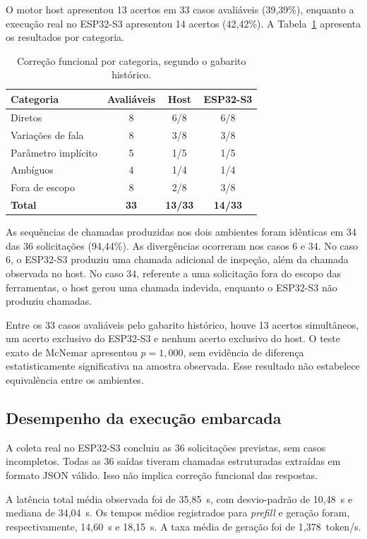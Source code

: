 \documentclass[12pt]{article}
\begin{document}
O motor host apresentou 13 acertos em 33 casos
avaliáveis (39,39\%), enquanto a execução real no
ESP32-S3 apresentou 14 acertos (42,42\%). A
Tabela~\ref{tab:metricas} apresenta os resultados
por categoria.

\begin{table}[ht]
\centering
\caption{Correção funcional por categoria, segundo o
gabarito histórico.}
\label{tab:metricas}
\begin{tabular}{lccc}
\toprule
Categoria & Avaliáveis & Host & ESP32-S3 \\
\midrule
Diretos & 8 & 6/8 & 6/8 \\
Variações de fala & 8 & 3/8 & 3/8 \\
Parâmetro implícito & 5 & 1/5 & 1/5 \\
Ambíguos & 4 & 1/4 & 1/4 \\
Fora de escopo & 8 & 2/8 & 3/8 \\
\midrule
\textbf{Total} & \textbf{33} &
\textbf{13/33} & \textbf{14/33} \\
\bottomrule
\end{tabular}
\end{table}

As sequências de chamadas produzidas nos dois
ambientes foram idênticas em 34 das 36 solicitações
(94,44\%). As divergências ocorreram nos casos
6 e 34. No caso 6, o ESP32-S3 produziu uma
chamada adicional de inspeção, além da chamada
observada no host. No caso 34, referente a uma
solicitação fora do escopo das ferramentas, o
host gerou uma chamada indevida, enquanto o
ESP32-S3 não produziu chamadas.

Entre os 33 casos avaliáveis pelo gabarito
histórico, houve 13 acertos simultâneos,
um acerto exclusivo do ESP32-S3 e nenhum
acerto exclusivo do host. O teste exato de
McNemar apresentou $p=1{,}000$, sem evidência
de diferença estatisticamente significativa
na amostra observada. Esse resultado não
estabelece equivalência entre os ambientes.

\subsection{Desempenho da execução embarcada}

A coleta real no ESP32-S3 concluiu as 36
solicitações previstas, sem casos incompletos.
Todas as 36 saídas tiveram chamadas estruturadas
extraídas em formato JSON válido. Isso não
implica correção funcional das respostas.

A latência total média observada foi de
35,85~s, com desvio-padrão de 10,48~s e
mediana de 34,04~s. Os tempos médios
registrados para \textit{prefill} e geração
foram, respectivamente, 14,60~s e 18,15~s.
A taxa média de geração foi de
1,378~token/s.
\end{document}
